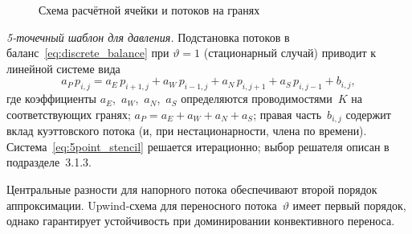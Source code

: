 \begin{figure}[!ht]
\centering
{}
\caption{Схема расчётной ячейки и потоков на гранях}
\label{fig:cell_fluxes}
\end{figure}

\textit{5-точечный шаблон для давления.}
Подстановка потоков в баланс~\eqref{eq:discrete_balance} при $\vartheta = 1$ (стационарный случай) приводит к линейной системе вида
\begin{equation}\label{eq:5point_stencil}
  a_P\,p_{i,j} = a_E\,p_{i+1,j} + a_W\,p_{i-1,j}
    + a_N\,p_{i,j+1} + a_S\,p_{i,j-1} + b_{i,j},
\end{equation}
где коэффициенты $a_E$,~$a_W$,~$a_N$,~$a_S$ определяются проводимостями~$K$ на соответствующих гранях; $a_P = a_E + a_W + a_N + a_S$; правая часть~$b_{i,j}$ содержит вклад куэттовского потока (и, при нестационарности, члена по времени). Система~\eqref{eq:5point_stencil} решается итерационно; выбор решателя описан в подразделе~3.1.3.

Центральные разности для напорного потока обеспечивают второй порядок аппроксимации. Upwind-схема для переносного потока~$\vartheta$ имеет первый порядок, однако гарантирует устойчивость при доминировании конвективного переноса.
